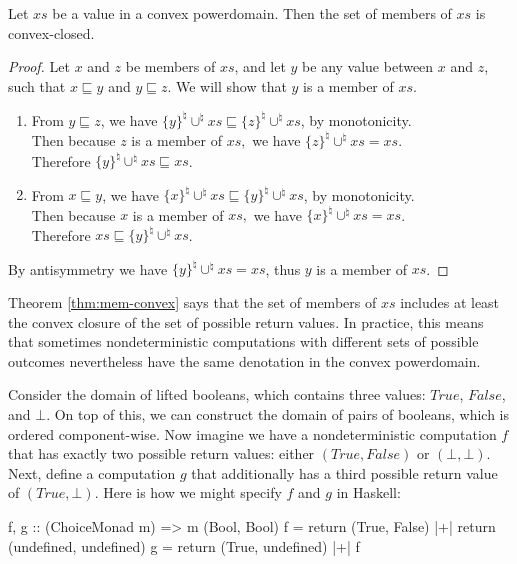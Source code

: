 \begin{theorem}
\label{thm:mem-convex}
Let $xs$ be a value in a convex powerdomain. Then the set of members of $xs$ is convex-closed.
\end{theorem}
\begin{proof}
Let $x$ and $z$ be members of $xs$, and let $y$ be any value between $x$ and $z$, such that $x\sqsubseteq y$ and $y\sqsubseteq z$. We will show that $y$ is a member of $xs$.
\begin{enumerate}
\item From $y\sqsubseteq z$, we have $\{y\}^{\natural}\cup^{\natural}xs\sqsubseteq\{z\}^{\natural}\cup^{\natural}xs$,
by monotonicity.\\
Then because $z$ is a member of $xs,$ we have $\{z\}^{\natural}\cup^{\natural}xs=xs$.\\
Therefore $\{y\}^{\natural}\cup^{\natural}xs\sqsubseteq xs$.
\item From $x\sqsubseteq y$, we have $\{x\}^{\natural}\cup^{\natural}xs\sqsubseteq\{y\}^{\natural}\cup^{\natural}xs$,
by monotonicity.\\
Then because $x$ is a member of $xs,$ we have $\{x\}^{\natural}\cup^{\natural}xs=xs$.\\
Therefore $xs\sqsubseteq\{y\}^{\natural}\cup^{\natural}xs$.
\end{enumerate}
By antisymmetry we have $\{y\}^{\natural}\cup^{\natural}xs=xs$, thus $y$ is a member of $xs$.
\end{proof}

Theorem \ref{thm:mem-convex} says that the set of members of $xs$ includes at least the convex closure of the set of possible return values. In practice, this means that sometimes nondeterministic computations with different sets of possible outcomes nevertheless have the same denotation in the convex powerdomain.

Consider the domain of lifted booleans, which contains three values: $\mathit{True}$, $\mathit{False}$, and $\bot$. On top of this, we can construct the domain of pairs of booleans, which is ordered component-wise. Now imagine we have a nondeterministic computation $f$ that has exactly two possible return values: either $(\mathit{True},\mathit{False})$ or $(\bot,\bot)$. Next, define a computation $g$ that additionally has a third possible return value of $(\mathit{True},\bot)$. Here is how we might specify $f$ and $g$ in Haskell:

\begin{hscode}
f, g :: (ChoiceMonad m) => m (Bool, Bool)
f = return (True, False) |+| return (undefined, undefined)
g = return (True, undefined) |+| f
\end{hscode}

